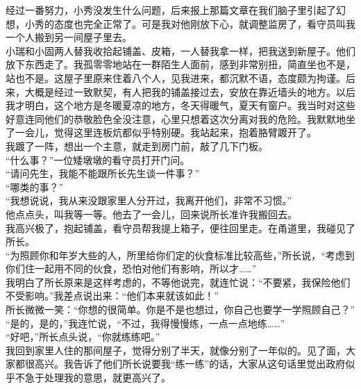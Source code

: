 经过一番努力，小秀没发生什么问题，后来报上那篇文章在我们脑子里引起了幻想，小秀的态度也完全正常了。可是我对他刚放下心，就调整监房了，看守员叫我一个人搬到另一间屋子里去。\\

小瑞和小固两人替我收拾起铺盖、皮箱，一人替我拿一样，把我送到新屋子。他们放下东西走了。我孤零零地站在一群陌生人面前，感到非常别扭，简直坐也不是，站也不是。这屋子里原来住着八个人，见我进来，都沉默不语，态度颇为拘谨。后来，大概是经过一致默契，有人把我的铺盖接过去，安放在靠近墙头的地方。以后我才明白，这个地方是冬暖夏凉的地方，冬天得暖气，夏天有窗户。我当时对这些好意连同他们的恭敬脸色全没注意，心里只想着这次分离对我的危险。我默默地坐了一会儿，觉得这里连板炕都似乎特别硬。我站起来，抱着胳臂踱开了。\\

我踱了一阵，想出一个主意，就走到房门前，敲了几下门板。\\

“什么事？”一位矮墩墩的看守员打开门问。\\

“请问先生，我能不能跟所长先生谈一件事？”\\

“哪类的事？”\\

“我想说说，我从来没跟家里人分开过，我离开他们，非常不习惯。”\\

他点点头，叫我等一等。他去了一会儿，回来说所长准许我搬回去。\\

我高兴极了，抱起铺盖，看守员帮我提上箱子，便往回里走。在甬道里，我碰见了所长。\\

“为照顾你和年岁大些的人，所里给你们定的伙食标准比较高些，”所长说，“考虑到你们住一起用不同的伙食，恐怕对他们有影响，所以才……”\\

我明白了所长原来是这样考虑的，不等他说完，就连忙说：“不要紧，我保险他们不受影响。”我差点说出来：“他们本来就该如此！”\\

所长微微一笑：“你想的很简单。你是不是也想过，你自己也要学一学照顾自己？”\\

“是的，是的，”我连忙说，“不过，我得慢慢练，一点一点地练……”\\

“好吧，”所长点头说，“你就练练吧。”\\

我回到家里人住的那间屋子，觉得分别了半天，就像分别了一年似的。见了面，大家都很高兴。我告诉了他们所长说要我“练一练”的话，大家从这句话里觉出政府似乎不急于处理我的意思，就更高兴了。\\

